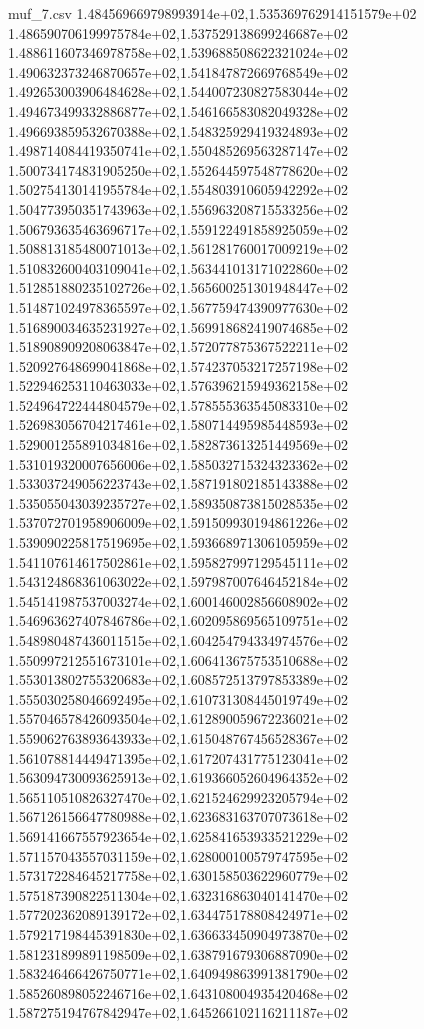 \begin{filecontents*}{muf_7.csv}
1.484569669798993914e+02,1.535369762914151579e+02
1.486590706199975784e+02,1.537529138699246687e+02
1.488611607346978758e+02,1.539688508622321024e+02
1.490632373246870657e+02,1.541847872669768549e+02
1.492653003906484628e+02,1.544007230827583044e+02
1.494673499332886877e+02,1.546166583082049328e+02
1.496693859532670388e+02,1.548325929419324893e+02
1.498714084419350741e+02,1.550485269563287147e+02
1.500734174831905250e+02,1.552644597548778620e+02
1.502754130141955784e+02,1.554803910605942292e+02
1.504773950351743963e+02,1.556963208715533256e+02
1.506793635463696717e+02,1.559122491858925059e+02
1.508813185480071013e+02,1.561281760017009219e+02
1.510832600403109041e+02,1.563441013171022860e+02
1.512851880235102726e+02,1.565600251301948447e+02
1.514871024978365597e+02,1.567759474390977630e+02
1.516890034635231927e+02,1.569918682419074685e+02
1.518908909208063847e+02,1.572077875367522211e+02
1.520927648699041868e+02,1.574237053217257198e+02
1.522946253110463033e+02,1.576396215949362158e+02
1.524964722444804579e+02,1.578555363545083310e+02
1.526983056704217461e+02,1.580714495985448593e+02
1.529001255891034816e+02,1.582873613251449569e+02
1.531019320007656006e+02,1.585032715324323362e+02
1.533037249056223743e+02,1.587191802185143388e+02
1.535055043039235727e+02,1.589350873815028535e+02
1.537072701958906009e+02,1.591509930194861226e+02
1.539090225817519695e+02,1.593668971306105959e+02
1.541107614617502861e+02,1.595827997129545111e+02
1.543124868361063022e+02,1.597987007646452184e+02
1.545141987537003274e+02,1.600146002856608902e+02
1.546963627407846786e+02,1.602095869565109751e+02
1.548980487436011515e+02,1.604254794334974576e+02
1.550997212551673101e+02,1.606413675753510688e+02
1.553013802755320683e+02,1.608572513797853389e+02
1.555030258046692495e+02,1.610731308445019749e+02
1.557046578426093504e+02,1.612890059672236021e+02
1.559062763893643933e+02,1.615048767456528367e+02
1.561078814449471395e+02,1.617207431775123041e+02
1.563094730093625913e+02,1.619366052604964352e+02
1.565110510826327470e+02,1.621524629923205794e+02
1.567126156647780988e+02,1.623683163707073618e+02
1.569141667557923654e+02,1.625841653933521229e+02
1.571157043557031159e+02,1.628000100579747595e+02
1.573172284645217758e+02,1.630158503622960779e+02
1.575187390822511304e+02,1.632316863040141470e+02
1.577202362089139172e+02,1.634475178808424971e+02
1.579217198445391830e+02,1.636633450904973870e+02
1.581231899891198509e+02,1.638791679306887090e+02
1.583246466426750771e+02,1.640949863991381790e+02
1.585260898052246716e+02,1.643108004935420468e+02
1.587275194767842947e+02,1.645266102116211187e+02

\end{filecontents*}
